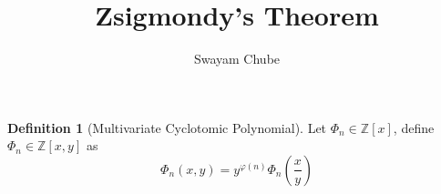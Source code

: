 \documentclass[12pt]{amsart}
\title{Zsigmondy's Theorem}
\author{Swayam Chube}
\theoremstyle{definition}
\newtheorem{definition}{Definition}
\newcommand{\Z}{\mathbb{Z}}
\begin{document}
\maketitle
\begin{definition}[Multivariate Cyclotomic Polynomial]
    Let $\Phi_n\in\Z[x]$, define $\Phi_n\in\Z[x,y]$ as 
    \begin{equation*}
        \Phi_n(x, y) = y^{\varphi(n)}\Phi_n\left(\frac{x}{y}\right)
    \end{equation*}
\end{definition}
\end{document}
